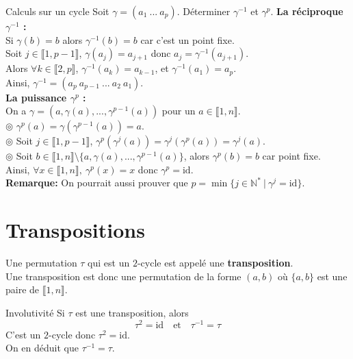 \documentclass[11pt]{article}
\newcommand*{\N}{\mathbb{N}}
\newcommand*{\lb}{\llbracket}
\newcommand*{\rb}{\rrbracket}
\newcommand*{\id}{\text{id}}
\newcommand*{\n}{\\[0.2cm]}
\renewcommand*{\t}{\tau}
\newcommand{\0}{\varnothing}
\newcommand*{\g}{\gamma}
\begin{document}
\begin{ex}{Calculs sur un cycle}{}
    Soit $\g=(a_1~...~a_p)$. Déterminer $\g^{-1}$ et $\g^p$.
    \tcblower
    \textbf{La réciproque $\g^{-1}$ :}\\
    Si $\g(b)=b$ alors $\g^{-1}(b)=b$ car c'est un point fixe.\\
    Soit $j\in\lb1,p-1\rb$, $\g(a_j)=a_{j+1}$ donc $a_j=\g^{-1}(a_{j+1})$.\\
    Alors $\forall k \in \lb2,p\rb$, $\g^{-1}(a_k)=a_{k-1}$, et $\g^{-1}(a_1)=a_p$.\\
    Ainsi, $\g^{-1}=(a_p ~ a_{p-1} ~ ... ~ a_2 ~ a_1)$.\\[0.2cm]
    \textbf{La puissance $\g^p$ :}\\
    On a $\g=(a, \g(a), ..., \g^{p-1}(a))$ pour un $a\in\lb1,n\rb$.\\
    $\circledcirc$ $\g^p(a)=\g(\g^{p-1}(a))=a$.\\
    $\circledcirc$ Soit $j\in\lb1,p-1\rb$, $\g^p(\g^j(a))=\g^j(\g^p(a))=\g^j(a)$.\\
    $\circledcirc$ Soit $b\in\lb1,n\rb\setminus\{a,\g(a),...,\g^{p-1}(a)\}$, alors $\g^p(b)=b$ car point fixe.\\
    Ainsi, $\forall x \in \lb1,n\rb, ~ \g^p(x)=x$ donc $\g^p=\id$.\n
    \textbf{Remarque:} On pourrait aussi prouver que $p=\min\{j\in\N^*~|~\g^j=\id\}$.
\end{ex}

\section{Transpositions}

\begin{defi}{}{}
    Une permutation $\t$ qui est un $2$-cycle est appelé une \textbf{transposition}.\\
    Une transposition est donc une permutation de la forme $(a,b)$ où $\{a,b\}$ est une paire de $\lb1,n\rb$.
\end{defi}

\begin{prop}{Involutivité}{}
    Si $\t$ est une transposition, alors 
    \begin{equation*}
        \t^2=\id \quad \text{et} \quad \t^{-1}=\t
    \end{equation*}
    \tcblower
    C'est un $2$-cycle donc $\t^2=\id$.\\
    On en déduit que $\t^{-1}=\t$.
\end{prop}
\end{document}
